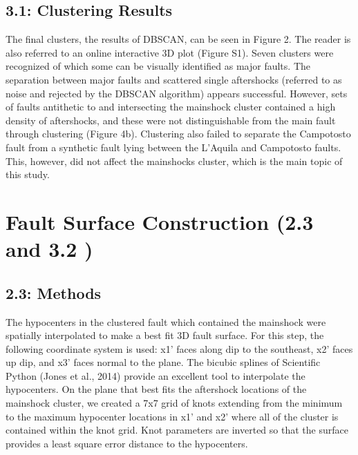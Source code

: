\documentclass[11pt]{article}
\begin{document}
    
    
    \subsection{3.1: Clustering Results}\label{clustering-results}

    The final clusters, the results of DBSCAN, can be seen in Figure 2. The
reader is also referred to an online interactive 3D plot (Figure S1).
Seven clusters were recognized of which some can be visually identified
as major faults. The separation between major faults and scattered
single aftershocks (referred to as noise and rejected by the DBSCAN
algorithm) appears successful. However, sets of faults antithetic to and
intersecting the mainshock cluster contained a high density of
aftershocks, and these were not distinguishable from the main fault
through clustering (Figure 4b). Clustering also failed to separate the
Campotosto fault from a synthetic fault lying between the L'Aquila and
Campotosto faults. This, however, did not affect the mainshocks cluster,
which is the main topic of this study.

    \section{Fault Surface Construction (2.3 and 3.2
)}\label{fault-surface-construction-2.3-and-3.2}

    \subsection{2.3: Methods}\label{methods}

    The hypocenters in the clustered fault which contained the mainshock
were spatially interpolated to make a best fit 3D fault surface. For
this step, the following coordinate system is used: x1' faces along dip
to the southeast, x2' faces up dip, and x3' faces normal to the plane.
The bicubic splines of Scientific Python (Jones et al., 2014) provide an
excellent tool to interpolate the hypocenters. On the plane that best
fits the aftershock locations of the mainshock cluster, we created a 7x7
grid of knots extending from the minimum to the maximum hypocenter
locations in x1' and x2' where all of the cluster is contained within
the knot grid. Knot parameters are inverted so that the surface provides
a least square error distance to the hypocenters.
\end{document}
